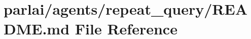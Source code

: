 \hypertarget{parlai_2agents_2repeat__query_2README_8md}{}\section{parlai/agents/repeat\+\_\+query/\+R\+E\+A\+D\+ME.md File Reference}
\label{parlai_2agents_2repeat__query_2README_8md}
